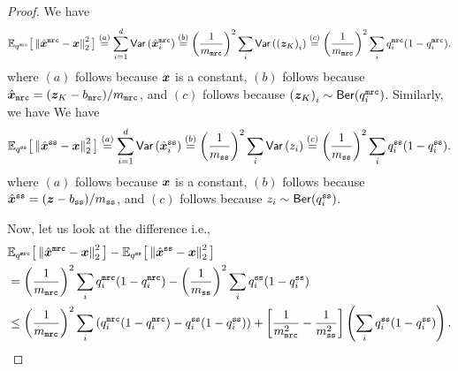 \begin{proof}
We have
$$  \mathbb{E}_{q^{\texttt{mrc}}} \big[ \left\lVert  \hat{{\boldsymbol{x}}}^\texttt{mrc} - {\boldsymbol{x}} \right\rVert^2_2  \big]  \stackrel{(a)}{=} \sum_{i=1}^d \mathsf{Var}\left( \hat{{\boldsymbol{x}}}^\texttt{mrc}_i \right) \stackrel{(b)}{=} \left(\frac{1}{m_\texttt{mrc}}\right)^2 \sum_i \mathsf{Var} \left( \left( {\boldsymbol{z}}_K \right)_i\right) \stackrel{(c)}{=} \left(\frac{1}{m_\texttt{mrc}}\right)^2 \sum_i q^{\texttt{mrc}}_i (1-q^{\texttt{mrc}}_i). $$
where $(a)$ follows because ${\boldsymbol{x}}$ is a constant, $(b)$ follows because $\hat{{\boldsymbol{x}}}_\texttt{mrc} =({\boldsymbol{z}}_K - b_\texttt{mrc})/m_\texttt{mrc}$, and $(c)$ follows because $\left( {\boldsymbol{z}}_K \right)_i\sim\mathsf{Ber}(q^{\texttt{mrc}}_i)$. Similarly, we have
We have
$$  \mathbb{E}_{q^{\texttt{ss}}} \big[ \left\lVert  \hat{{\boldsymbol{x}}}^\texttt{ss} - {\boldsymbol{x}} \right\rVert^2_2  \big]  \stackrel{(a)}{=} \sum_{i=1}^d \mathsf{Var}\left( \hat{{\boldsymbol{x}}}^\texttt{ss}_i \right) \stackrel{(b)}{=} \left(\frac{1}{m_\texttt{ss}}\right)^2 \sum_i \mathsf{Var} \left( z_i\right) \stackrel{(c)}{=} \left(\frac{1}{m_\texttt{ss}}\right)^2 \sum_i q^{\texttt{ss}}_i (1-q^{\texttt{ss}}_i). $$
where $(a)$ follows because ${\boldsymbol{x}}$ is a constant, $(b)$ follows because $\hat{{\boldsymbol{x}}}^\texttt{ss} =({\boldsymbol{z}} -  b_\texttt{ss})/m_\texttt{ss}$, and $(c)$ follows because $z_i\sim\mathsf{Ber}(q^{\texttt{ss}}_i)$.

Now, let us look at the difference i.e.,
\begin{align*}
    & \mathbb{E}_{q^{\texttt{mrc}}} \big[ \left\lVert  \hat{{\boldsymbol{x}}}^\texttt{mrc} - {\boldsymbol{x}} \right\rVert^2_2  \big] - \mathbb{E}_{q^{\texttt{ss}}} \big[ \left\lVert  \hat{{\boldsymbol{x}}}^\texttt{ss} - {\boldsymbol{x}} \right\rVert^2_2  \big] \\
    & = \left(\frac{1}{m_\texttt{mrc}}\right)^2 \sum_i q^{\texttt{mrc}}_i (1-q^{\texttt{mrc}}_i) - \left(\frac{1}{m_\texttt{ss}}\right)^2 \sum_i q^{\texttt{ss}}_i (1-q^{\texttt{ss}}_i)\\
    & \leq \left(\frac{1}{m_\texttt{mrc}}\right)^2\sum_{i}\left( q^{\texttt{mrc}}_i (1-q^{\texttt{mrc}}_i) - q^{\texttt{ss}}_i (1-q^{\texttt{ss}}_i) \right) + \left[ \frac{1}{m_\texttt{mrc}^2}-\frac{1}{m_\texttt{ss}^2}\right]\left( \sum_i q^{\texttt{ss}}_i (1-q^{\texttt{ss}}_i) \right).
\end{align*}



\end{proof}
